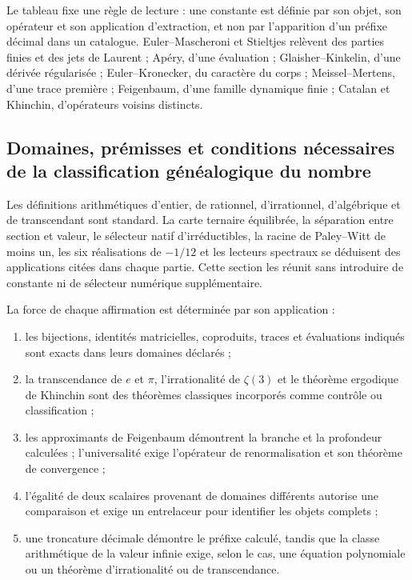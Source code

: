 Le tableau fixe une règle de lecture : une constante est définie par son
objet, son opérateur et son application d'extraction, et non par l'apparition d'un
préfixe décimal dans un catalogue. Euler--Mascheroni et Stieltjes relèvent des
parties finies et des jets de Laurent ; Apéry, d'une évaluation ;
Glaisher--Kinkelin, d'une dérivée régularisée ; Euler--Kronecker, du caractère
du corps ; Meissel--Mertens, d'une trace première ; Feigenbaum, d'une famille
dynamique finie ; Catalan et Khinchin, d'opérateurs voisins distincts.

\subsection{Domaines, prémisses et conditions nécessaires de la classification généalogique du nombre}

Les définitions arithmétiques d'entier, de rationnel, d'irrationnel, d'algébrique et de
transcendant sont standard. La carte ternaire équilibrée, la séparation entre
section et valeur, le sélecteur natif d'irréductibles, la racine de Paley--Witt de
moins un, les six réalisations de \(-1/12\) et les lecteurs spectraux se
déduisent des applications citées dans chaque partie. Cette section les réunit sans
introduire de constante ni de sélecteur numérique supplémentaire.

La force de chaque affirmation est déterminée par son application :
\begin{enumerate}
\item les bijections, identités matricielles, coproduits, traces et
      évaluations indiqués sont exacts dans leurs domaines déclarés ;
\item la transcendance de \(e\) et \(\pi\), l'irrationalité de
      \(\zeta(3)\) et le théorème ergodique de Khinchin sont des théorèmes classiques
      incorporés comme contrôle ou classification ;
\item les approximants de Feigenbaum démontrent la branche et la profondeur
      calculées ; l'universalité exige l'opérateur de renormalisation et
      son théorème de convergence ;
\item l'égalité de deux scalaires provenant de domaines différents
      autorise une comparaison et exige un entrelaceur pour identifier les
      objets complets ;
\item une troncature décimale démontre le préfixe calculé, tandis que la
      classe arithmétique de la valeur infinie exige, selon le cas, une équation
      polynomiale ou un théorème d'irrationalité ou de transcendance.
\end{enumerate}

